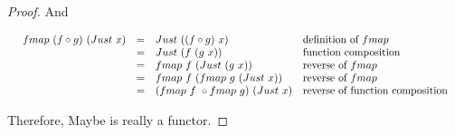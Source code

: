 \documentclass[b5paper]{article}
\begin{document}
\begin{example}
\begin{mdframed}
\begin{proof}
And

\[
\resizebox{\textwidth}{!}{\ensuremath{
\begin{array}{rcll}
fmap\ (f \circ g)\ (Just\ x) & = & Just\ ((f \circ g)\ x) & \text{definition of $fmap$} \\
           & = & Just\ (f\ (g\ x)) & \text{function composition} \\
           & = & fmap\ f\ (Just\ (g\ x)) & \text{reverse of $fmap$} \\
           & = & fmap\ f\ (fmap\ g\ (Just\ x)) & \text{reverse of $fmap$} \\
           & = & (fmap\ f\ \circ fmap\ g)\ (Just\ x) & \text{reverse of function composition}
\end{array}
}}
\]

Therefore, Maybe is really a functor.
\end{proof}
\end{mdframed}
\end{example}
\end{document}
